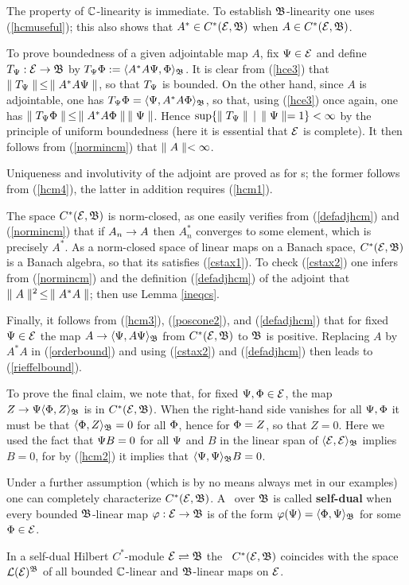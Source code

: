 The property of ${\Bbb C}$-linearity is immediate.  To establish
${\frak B}$-linearity one uses (\ref{hcmuseful}); this also shows that
$A^*\in C^*({\cal E},{\frak B})$ when $A\in C^*({\cal E},{\frak B})$.

To prove boundedness of a given adjointable map $A$, fix $\Psi\in{\cal E}$
and define $T_{\Psi}:{\cal E}\rightarrow{\frak B}$ by $T_{\Psi}\Phi:=\langle A^*A\Psi,\Phi\rangle_{\frak B}$.
It is clear from (\ref{hce3}) that $\parallel T_{\Psi}\parallel\,\leq\,\parallel A^*A\Psi\parallel$,
so that $T_{\Psi}$ is bounded. On the other hand, since $A$ is
adjointable, one has $T_{\Psi}\Phi=\langle \Psi,A^*A\Phi\rangle_{\frak B}$, so that, using
(\ref{hce3}) once again, one has $\parallel T_{\Psi}\Phi\parallel\,\leq\, \parallel
A^*A\Phi\parallel\,\parallel\Psi\parallel$. Hence $\sup \{\parallel T_{\Psi}\parallel\, |\, \parallel\Psi\parallel
=1\}<\infty$ by the principle of uniform boundedness (here it is
essential that ${\cal E}$ is complete). It then follows from
(\ref{normincm}) that $\parallel A\parallel<\infty$.

Uniqueness and involutivity of the adjoint are proved as for \Hs s;
the former follows from (\ref{hcm4}), the latter in addition requires
(\ref{hcm1}).

The space $C^*({\cal E},{\frak B})$ is norm-closed, as one easily verifies from
(\ref{defadjhcm}) and (\ref{normincm}) that if $A_n\rightarrow A$ then
$A^*_n$ converges to some element, which is precisely $A^*$. As a
norm-closed space of linear maps on a Banach space, $C^*({\cal E},{\frak B})$ is a
Banach algebra, so that its satisfies (\ref{cstax1}).  To check 
(\ref{cstax2}) one infers from (\ref{normincm}) and the definition
(\ref{defadjhcm}) of the adjoint that $\parallel A\parallel^2\,\leq\,\parallel A^*A\parallel$;
then use Lemma \ref{ineqcs}.

Finally, it follows from (\ref{hcm3}), (\ref{poscone2}), and
 (\ref{defadjhcm}) that for fixed $\Psi\in{\cal E}$ the map $A\rightarrow
 \langle\Psi,A\Psi\rangle_{\frak B}$ from $C^*({\cal E},{\frak B})$ to ${\frak B}$ is positive.  Replacing
 $A$ by $A^*A$ in (\ref{orderbound}) and using (\ref{cstax2}) and
 (\ref{defadjhcm}) then leads to (\ref{rieffelbound}).

To prove the final claim, we note that, for fixed $\Psi,\Phi\in{\cal E}$, the
map $Z\rightarrow \Psi\langle\Phi,Z\rangle_{\frak B}$ is in $C^*({\cal E},{\frak B})$. When the right-hand
side vanishes for all $\Psi,\Phi$ it must be that $\langle\Phi,Z\rangle_{\frak B}=0$ for
all $\Phi$, hence for $\Phi =Z$, so that $Z=0$. Here we used the fact
that $\Psi B=0$ for all $\Psi$ and $B$ in the linear span of
$\langle{\cal E},{\cal E}\rangle_{\frak B}$ implies $B=0$, for by (\ref{hcm2}) it implies that
$\langle\Psi,\Psi\rangle_{\frak B} B=0$.  \enp

Under a further assumption (which is by no means always met in our
examples) one can completely characterize $C^*({\cal E},{\frak B})$. A \HCM\ over
${\frak B}$ is called {\bf self-dual} when every
bounded ${\frak B}$-linear map $\varphi:{\cal E}\rightarrow{\frak B}$ is of the form
$\varphi(\Psi)=\langle\Phi,\Psi\rangle_{\frak B}$ for some $\Phi\in{\cal E}$.
\begin{Proposition}
In a self-dual Hilbert $C^*$-module ${\cal E}\rightleftharpoons{\frak B}$ the \ca\ $C^*({\cal E},{\frak B})$
coincides with the space ${\cal L}({\cal E})^{{\frak B}}$ of all bounded
${\Bbb C}$-linear and ${\frak B}$-linear maps on ${\cal E}$.\end{Proposition}

